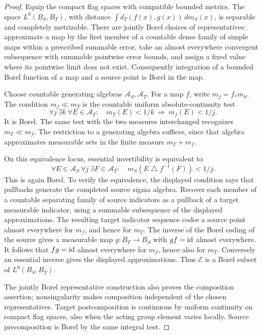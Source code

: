 \begin{proof}
Equip the compact flag spaces with compatible bounded metrics.  The space
\(L^0(B_S,B_T)\), with distance
\(\int d_T(f(x),g(x))\,dm_S(x)\), is separable and completely metrizable.
There are jointly Borel choices of representatives: approximate a map by
the first member of a countable dense family of simple maps within a
prescribed summable error, take an almost everywhere convergent subsequence
with summable pointwise error bounds, and assign a fixed value where its
pointwise limit does not exist.  Consequently integration of a bounded
Borel function of a map and a source point is Borel in the map.

Choose countable generating algebras \(\mathcal A_S,\mathcal A_T\).
For a map \(f\), write \(m_f=f_*m_S\).  The condition \(m_f\ll m_T\)
is the countable uniform absolute-continuity test
\[
 \forall j\ \exists k\ \forall E\in\mathcal A_T:
 \quad m_T(E)<1/k\ \Longrightarrow\ m_f(E)<1/j.
\]
It is Borel.  The same test with the two measures interchanged recognizes
\(m_T\ll m_f\).  The restriction to a generating algebra suffices, since
that algebra approximates measurable sets in the finite measure
\(m_T+m_f\).

On this equivalence locus, essential invertibility is equivalent to
\[
 \forall E\in\mathcal A_S\ \forall j\ \exists F\in\mathcal A_T:
 \quad m_S(E\mathbin\triangle f^{-1}(F))<1/j.
\]
This is again Borel.  To verify the equivalence, the displayed condition
says that pullbacks generate the completed source sigma algebra.  Recover
each member of a countable separating family of source indicators as a
pullback of a target measurable indicator, using a summable subsequence of
the displayed approximations.  The resulting target indicator sequence
codes a source point almost everywhere for \(m_f\), and hence for \(m_T\).
The inverse of the Borel coding of the source gives a measurable map
\(g:B_T\to B_S\) with \(g f=\operatorname{id}\) almost everywhere.  It follows that
\(f g=\operatorname{id}\) almost everywhere for \(m_f\), hence also for \(m_T\).
Conversely an essential inverse gives the displayed approximations.
Thus \(\mathscr E\) is a Borel subset of \(L^0(B_S,B_T)\).

The jointly Borel representative construction also proves the composition
assertion; nonsingularity makes composition independent of the chosen
representatives.  Target postcomposition is continuous by uniform
continuity on compact flag spaces, also when the acting group element
varies locally.  Source precomposition is Borel by the same integral test.


\end{proof}
